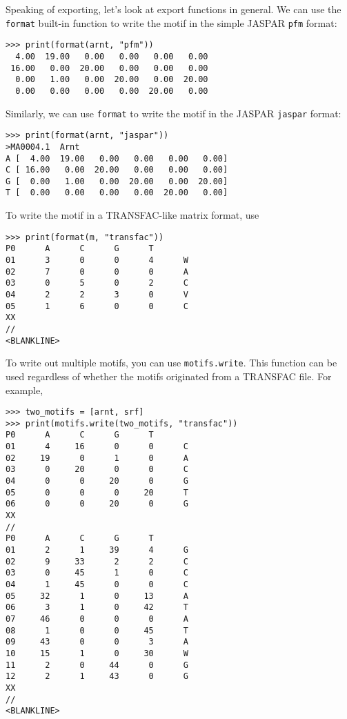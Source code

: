 Speaking of exporting, let's look at export functions in general.
We can use the \verb+format+ built-in function to write the motif in the simple JASPAR \verb+pfm+ format:
\begin{verbatim}
>>> print(format(arnt, "pfm"))
  4.00  19.00   0.00   0.00   0.00   0.00
 16.00   0.00  20.00   0.00   0.00   0.00
  0.00   1.00   0.00  20.00   0.00  20.00
  0.00   0.00   0.00   0.00  20.00   0.00
\end{verbatim}
Similarly, we can use \verb+format+ to write the motif in the JASPAR \verb+jaspar+ format:
\begin{verbatim}
>>> print(format(arnt, "jaspar"))
>MA0004.1  Arnt
A [  4.00  19.00   0.00   0.00   0.00   0.00]
C [ 16.00   0.00  20.00   0.00   0.00   0.00]
G [  0.00   1.00   0.00  20.00   0.00  20.00]
T [  0.00   0.00   0.00   0.00  20.00   0.00]
\end{verbatim}

To write the motif in a TRANSFAC-like matrix format, use

\begin{verbatim}
>>> print(format(m, "transfac"))
P0      A      C      G      T
01      3      0      0      4      W
02      7      0      0      0      A
03      0      5      0      2      C
04      2      2      3      0      V
05      1      6      0      0      C
XX
//
<BLANKLINE>
\end{verbatim}

To write out multiple motifs, you can use \verb+motifs.write+.
This function can be used regardless of whether the motifs originated from a TRANSFAC file. For example,

\begin{verbatim}
>>> two_motifs = [arnt, srf]
>>> print(motifs.write(two_motifs, "transfac"))
P0      A      C      G      T
01      4     16      0      0      C
02     19      0      1      0      A
03      0     20      0      0      C
04      0      0     20      0      G
05      0      0      0     20      T
06      0      0     20      0      G
XX
//
P0      A      C      G      T
01      2      1     39      4      G
02      9     33      2      2      C
03      0     45      1      0      C
04      1     45      0      0      C
05     32      1      0     13      A
06      3      1      0     42      T
07     46      0      0      0      A
08      1      0      0     45      T
09     43      0      0      3      A
10     15      1      0     30      W
11      2      0     44      0      G
12      2      1     43      0      G
XX
//
<BLANKLINE>
\end{verbatim}

